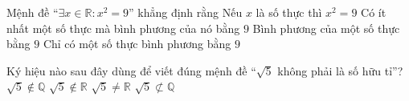 








\begin{ex}
	Mệnh đề ``$\exists x \in \mathbb{R}\colon x^2=9$'' khẳng định rằng
	\choice
		{Nếu $x$ là số thực thì $x^2=9$}
		{\True Có ít nhất một số thực mà bình phương của nó bằng $9$}
		{Bình phương của một số thực bằng $9$}
		{Chỉ có một số thực bình phương bằng $9$}
\end{ex}


\begin{ex}
	Ký hiệu nào sau đây dùng để viết đúng mệnh đề ``$\sqrt{5}$ không phải là số hữu tỉ''?
	\choice
		{\True $\sqrt{5} \notin \mathbb{Q}$}
		{$\sqrt{5} \notin \mathbb{R}$}
		{$\sqrt{5} \neq \mathbb{R}$}
		{$\sqrt{5} \not \subset \mathbb{Q}$}
\end{ex}

